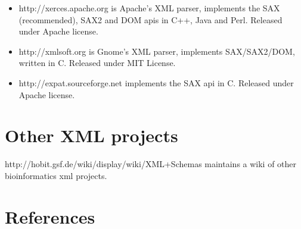 \documentclass{article}
\begin{document}
\begin{itemize}

\item http://xerces.apache.org is Apache's XML parser, implements the
SAX (recommended), SAX2 and DOM apis in C++, Java and Perl. Released
under Apache license.

\item http://xmlsoft.org is Gnome's XML parser, implements SAX/SAX2/DOM,
written in C. Released under MIT License.

\item http://expat.sourceforge.net implements the SAX api in C. Released
under Apache license.

\end{itemize}

\section{Other XML projects}
http://hobit.gsf.de/wiki/display/wiki/XML+Schemas maintains a wiki of
other bioinformatics xml projects.

\section{References}  
\end{document}
